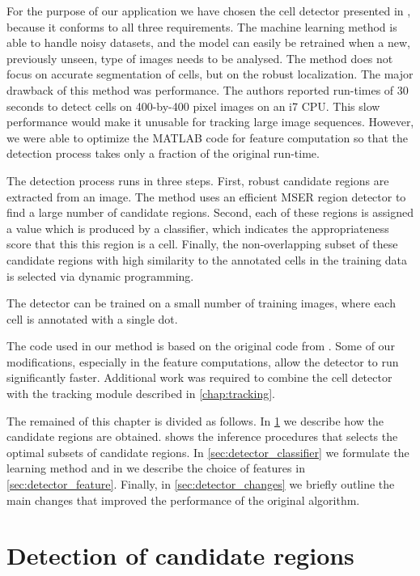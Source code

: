 	For the purpose of our application we have chosen the cell detector presented in \cite{arteta12}, because it conforms to all three requirements. The machine learning method is able to handle noisy datasets, and the model can easily be retrained when a new, previously unseen, type of images needs to be analysed. The method does not focus on accurate segmentation of cells, but on the robust localization. The major drawback of this method was performance. The authors reported run-times of 30 seconds to detect cells on 400-by-400 pixel images on an i7 CPU. This slow performance would make it unusable for tracking large image sequences. However, we were able to optimize the MATLAB code for feature computation so that the detection process takes only a fraction of the original run-time.
	
	The detection process runs in three steps. First, robust candidate regions are extracted from an image. The method uses an efficient MSER region detector \addref{} to find a large number of candidate regions. Second, each of these regions is assigned a value which is produced by a classifier, which indicates the appropriateness score that this this region is a cell. Finally, the non-overlapping subset of these candidate regions with high similarity to the annotated cells in the training data is selected via dynamic programming.
	
	The detector can be trained on a small number of training images, where each cell is  annotated with a single dot. 

	The code used in our method is based on the original code from \cite{arteta12}. Some of our modifications, especially in the feature computations, allow the detector to run significantly faster. Additional work was required to combine the cell detector with the tracking module described in \cref{chap:tracking}.
	
	The remained of this chapter is divided as follows. In \cref{sec:detector_extremal} we describe how the candidate regions are obtained.  shows the inference procedures that selects the optimal subsets of candidate regions. In \cref{sec:detector_classifier} we formulate the learning method and in we describe the choice of features in \cref{sec:detector_feature}. Finally, in \cref{sec:detector_changes} we briefly outline the main changes that improved the performance of the original algorithm.
	
	\section{Detection of candidate regions \statusfirstdraft}
	\label{sec:detector_extremal}
	
